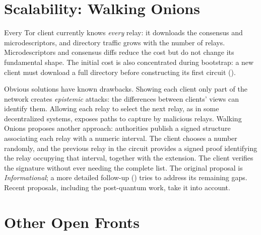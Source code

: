 \section{Scalability: Walking Onions}\label{sec:fut-walking}

Every Tor client currently knows \emph{every} relay: it downloads the consensus and microdescriptors, and directory traffic grows with the number of relays. Microdescriptors and consensus diffs reduce the cost but do not change its fundamental shape. The initial cost is also concentrated during bootstrap: a new client must download a full directory before constructing its first circuit ().

Obvious solutions have known drawbacks. Showing each client only part of the network creates \emph{epistemic} attacks: the differences between clients' views can identify them. Allowing each relay to select the next relay, as in some decentralized systems, exposes paths to capture by malicious relays. Walking Onions proposes another approach: authorities publish a signed structure associating each relay with a numeric interval. The client chooses a number randomly, and the previous relay in the circuit provides a signed proof identifying the relay occupying that interval, together with the extension. The client verifies the signature without ever needing the complete list. The original proposal is \emph{Informational}; a more detailed follow-up () tries to address its remaining gaps. Recent proposals, including the post-quantum work, take it into account.

\section{Other Open Fronts}\label{sec:fut-altri}

